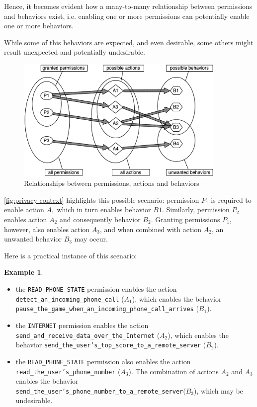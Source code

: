 \documentclass[twoside,letterpaper]{soups}
\theoremstyle{definition}
\newtheorem{example}{Example}
\begin{document}
Hence, it becomes evident how a many-to-many relationship between permissions and behaviors exist, i.e. enabling one or more permissions can potentially enable one or more behaviors.

While some of this behaviors are expected, and even desirable, some others might result unexpected and potentially undesirable. 

\begin{figure}[ht]
\centering
     \includegraphics[width=0.9\textwidth]{images/context.png}
      \caption{Relationships between permissions, actions and behaviors}
      \label{fig:privacy-context}
\end{figure}

\autoref{fig:privacy-context} highlights this possible scenario: permission $P_1$ is required to enable action $A_1$ which in turn enables behavior $B1$. Similarly, permission $P_2$ enables action $A_2$ and consequently behavior $B_2$. Granting permissions $P_1$, however, also enables action $A_3$, and when combined with action $A_2$, an unwanted behavior $B_3$ may occur.

Here is a practical instance of this scenario:
\begin{example}
\leavevmode
\label{ex:unwanted-behavior}
\begin{itemize}
       \item the \texttt{READ\_PHONE\_STATE} permission enables the action \texttt{detect\_an\_incoming\_phone\_call} ($A_1$), which enables the behavior \texttt{pause\_the\_game\_when\_an\_incoming\_phone\_call\_arrives} ($B_1$).
       \item the \texttt{INTERNET} permission enables the action \texttt{send\_and\_receive\_data\_over\_the\_Internet} ($A_2$), which enables the behavior \texttt{send\_the\_user's\_top\_score\_to\_a\_remote\_server} ($B_2$).
       \item the \texttt{READ\_PHONE\_STATE} permission also enables the action \texttt{read\_the\_user's\_phone\_number} ($A_3$). The combination of actions $A_2$ and $A_3$ enables the behavior \\ \texttt{send\_the\_user's\_phone\_number\_to\_a\_remote\_server}($B_3$), which may be undesirable.
\end{itemize} 
\end{example}
\end{document}
